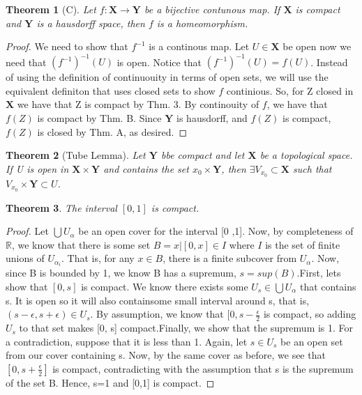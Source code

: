 \documentclass[a4paper, 12pt]{article}
\newcommand{\RR}{\mathbb{R}}
\newcommand{\XX}{\mathbf{X}}
\newcommand{\YY}{\mathbf{Y}}
\newtheorem{theorm}{Theorem}
\begin{document}
\begin{theorm}[C]
Let $f: \XX \rightarrow \YY$ be a bijective contunous map. If $\XX$ is compact and $\YY$ is a hausdorff space, then $f$ is a homeomorphism.
\end{theorm}
\begin{proof}
We need to show that $f^{-1}$ is a continous map. Let $U \in \XX$ be open now we need that $(f^{-1})^{-1}(U)$ is open. Notice that $(f^{-1})^{-1}(U) = f(U)$. Instead of using the definition of continuouity in terms of open sets, we will use the equivalent definiton that uses closed sets to show $f$ continious. So, for Z closed in $\XX$ we have that Z is compact by Thm. 3. By continouity of $f$, we have that $f(Z)$ is compact by Thm. B. Since $\YY$ is hausdorff, and $f(Z)$ is compact, $f(Z)$ is closed by Thm. A, as desired.
\end{proof}

\begin{theorm}[Tube Lemma]
Let $\YY$ bbe compact and let $\XX$ be a topological space. If U is open in $\XX \times \YY$ and contains the set ${x_0} \times \YY$, then $\exists V_{x_0} \subset \XX$ such that $V_{x_0} \times \YY \subset U$. 
\end{theorm}



\begin{theorm}
The interval $[0, 1]$ is compact.
\end{theorm}
\begin{proof}
        Let $\bigcup U_{\alpha}$ be an open cover for the interval [0 ,1]. Now, by completeness of $\RR$, we know that there is some set $B = {x | [0, x] \in I}$ where $I$ is the set of finite unions of $U_{\alpha_i}$. That is, for any $x \in B$, there is a finite subcover from $U_{\alpha}$. Now, since B is bounded by 1, we know B has a supremum, $s = sup(B)$.\newline First, lets show that $[0, s]$ is compact. We know there exists some $U_s \in \bigcup U_{\alpha}$ that contains s. It is open so it will also containsome small interval around s, that is, $(s-\epsilon, s+\epsilon) \in U_s$. By assumption, we know that $[0, s-\frac{\epsilon}{2}$ is compact, so adding $U_s$ to that set makes [0, s] compact.\newline Finally, we show that the supremum is 1. For a contradiction, suppose that it is less than 1. Again, let $s \in U_s$ be an open set from our cover containing s. Now, by the same cover as before, we see that $[0, s + \frac{\epsilon}{2}]$ is compact, contradicting with the assumption that s is the supremum of the set B. Hence, s=1 and [0,1] is compact.
\end{proof}
\end{document}
